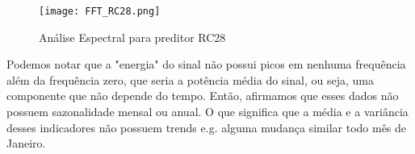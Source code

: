\begin{figure}[H]
\centering
\texttt{[image: FFT\_RC28.png]}
\caption{Análise Espectral para preditor RC28}
\end{figure}


Podemos notar que a "energia" do sinal não possui picos em nenhuma frequência além da frequência zero, que seria a potência média do sinal, ou seja, uma componente que não depende do tempo. Então, afirmamos que esses dados não possuem sazonalidade mensal ou anual. O que significa que a média e a variância desses indicadores não possuem trends e.g. alguma mudança similar todo mês de Janeiro.


